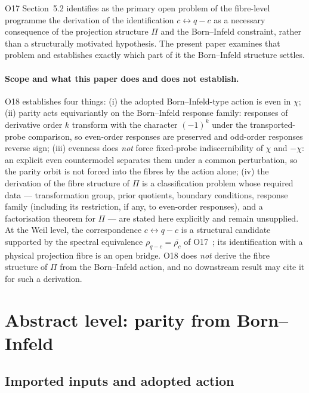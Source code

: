 \documentclass[11pt,a4paper]{article}
\newcommand{\Proj}{\Pi}
\newcommand{\chifield}{\chi}
\newcommand{\rhoc}{\rho_{c}}
\newcommand{\rhoqc}{\rho_{q-c}}
\begin{document}
    O17 Section~5.2 identifies as the primary open problem of the fibre-level programme the
    derivation of the identification $c \leftrightarrow q-c$ as a necessary consequence of
    the projection structure $\Proj$ and the Born--Infeld constraint, rather than a
    structurally motivated hypothesis.
    The present paper examines that problem and establishes exactly which part of it the
    Born--Infeld structure settles.

    \paragraph{Scope and what this paper does and does not establish.}
      O18 establishes four things:
      (i) the adopted Born--Infeld-type action is even in $\chifield$;
      (ii) parity acts equivariantly on the Born--Infeld response family: responses of
      derivative order $k$ transform with the character $(-1)^{k}$ under the
      transported-probe comparison, so even-order responses are preserved and odd-order
      responses reverse sign;
      (iii) evenness does \emph{not} force fixed-probe indiscernibility of $\chifield$ and
      $-\chifield$: an explicit even countermodel separates them under a common
      perturbation, so the parity orbit is not forced into the fibres by the action alone;
      (iv) the derivation of the fibre structure of $\Proj$ is a classification problem
      whose required data --- transformation group, prior quotients, boundary conditions,
      response family (including its restriction, if any, to even-order responses), and a
      factorisation theorem for $\Proj$ --- are stated here explicitly and remain
      unsupplied.
      At the Weil level, the correspondence $c \leftrightarrow q-c$ is a structural
      candidate supported by the spectral equivalence $\rhoqc=\overline{\rhoc}$ of
      O17~\cite{Beau2026a21}; its identification with a physical projection fibre is an
      open bridge.
      O18 does \emph{not} derive the fibre structure of $\Proj$ from the Born--Infeld
      action, and no downstream result may cite it for such a derivation.

  \section{Abstract level: parity from Born--Infeld}
  \label{sec:abstract}

  \subsection{Imported inputs and adopted action}
    \label{ssec:noninjectivity}
\end{document}

